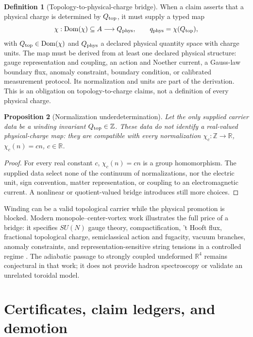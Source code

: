 \documentclass[11pt,a4paper]{article}
\theoremstyle{definition}
\newtheorem{definition}{Definition}[section]
\theoremstyle{plain}
\newtheorem{proposition}[definition]{Proposition}
\theoremstyle{remark}
\begin{document}
\begin{definition}[Topology-to-physical-charge bridge]\label{def:chargebridge}
When a claim asserts that a physical charge is determined by
\(Q_{\rm top}\), it must supply a typed map
\[
\chi:\operatorname{Dom}(\chi)\subseteq A\longrightarrow Q_{\rm phys},
\qquad q_{\rm phys}=\chi(Q_{\rm top}),
\]
with \(Q_{\rm top}\in\operatorname{Dom}(\chi)\) and \(Q_{\rm phys}\) a
declared physical quantity space with charge units.  The map must be derived
from at least one declared physical structure: gauge representation and
coupling, an action and Noether current, a Gauss-law boundary flux, anomaly
constraint, boundary condition, or calibrated measurement protocol.  Its
normalization and units are part of the derivation.  This is an obligation on
topology-to-charge claims, not a definition of every physical charge.
\end{definition}

\begin{proposition}[Normalization underdetermination]\label{thm:nocharge}
Let the only supplied carrier data be a winding invariant
\(Q_{\rm top}\in\mathbb Z\).  These data do not identify a real-valued
physical-charge map: they are compatible with every normalization
\(\chi_c:\mathbb Z\to\mathbb R\), \(\chi_c(n)=cn\), \(c\in\mathbb R\).
\end{proposition}
\begin{proof}
For every real constant \(c\), \(\chi_c(n)=cn\) is a group homomorphism.
The supplied data select none of the continuum of normalizations, nor the
electric unit, sign convention, matter representation, or coupling to an
electromagnetic current.  A nonlinear or quotient-valued bridge introduces
still more choices.
\end{proof}

Winding can be a valid topological carrier while the physical promotion is
blocked.  Modern monopole--center-vortex work illustrates the full price of a
bridge: it specifies \(SU(N)\) gauge theory, compactification, 't Hooft flux,
fractional topological charge, semiclassical action and fugacity, vacuum
branches, anomaly constraints, and representation-sensitive string tensions
in a controlled regime \citep{tanizakiunsal2022,hayashitanizaki2024}.  The
adiabatic passage to strongly coupled undeformed \(\mathbb R^4\) remains
conjectural in that work; it does not provide hadron spectroscopy or validate
an unrelated toroidal model.

\section{Certificates, claim ledgers, and demotion}\label{sec:certificates}
\end{document}
